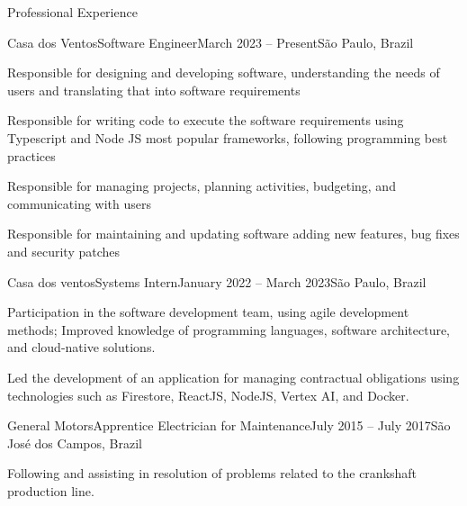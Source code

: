 \documentclass[]{template}
\begin{document}
\begin{section}{Professional Experience}
 \begin{subsection}{Casa dos Ventos}{Software Engineer}{March 2023 -- Present}{São Paulo, Brazil}
     \item Responsible for designing and developing software, understanding the needs of users and translating that into software requirements
     \item Responsible for writing code to execute the software requirements using Typescript and Node JS most popular frameworks, following programming best practices
     \item Responsible for managing projects, planning activities, budgeting, and communicating with users
     \item Responsible for maintaining and updating software adding new features, bug fixes and security patches
 \end{subsection}
 
 \begin{subsection}{Casa dos ventos}{Systems Intern}{January 2022 -- March 2023}{São Paulo, Brazil}
     \item Participation in the software development team, using agile development methods; Improved knowledge of programming languages, software architecture, and cloud-native solutions.
     \item Led the development of an application for managing contractual obligations using technologies such as Firestore, ReactJS, NodeJS, Vertex AI, and Docker.
 \end{subsection}
 
 \begin{subsection}{General Motors}{Apprentice Electrician for Maintenance}{July 2015 -- July 2017}{São José dos Campos, Brazil}
     \item Following and assisting in resolution of problems related to the crankshaft production line.
 \end{subsection}
 
\end{section}



\end{document}
